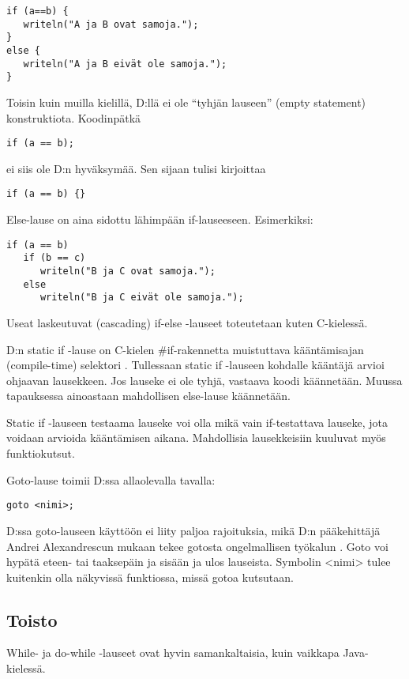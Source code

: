\documentclass[11pt,oneside,a4paper]{article}
\begin{document}
\begin{verbatim}
if (a==b) {
   writeln("A ja B ovat samoja.");
}
else {
   writeln("A ja B eivät ole samoja.");
}
\end{verbatim}
Toisin kuin muilla kielillä, D:llä ei ole ``tyhjän lauseen'' (empty statement)
konstruktiota. Koodinpätkä

\begin{verbatim}
if (a == b);
\end{verbatim}
ei siis ole D:n hyväksymää. Sen sijaan tulisi kirjoittaa

\begin{verbatim}
if (a == b) {}
\end{verbatim}
Else-lause on aina sidottu lähimpään if-lauseeseen. Esimerkiksi:

\begin{verbatim}
if (a == b)
   if (b == c)
      writeln("B ja C ovat samoja.");
   else
      writeln("B ja C eivät ole samoja.");
\end{verbatim}
Useat laskeutuvat (cascading) if-else -lauseet toteutetaan kuten C-kielessä.

D:n static if -lause on C-kielen \#if-rakennetta muistuttava kääntämisajan
(compile-time) selektori \cite{ALE10}.  Tullessaan static if -lauseen kohdalle
kääntäjä arvioi
ohjaavan lausekkeen. Jos lauseke ei ole tyhjä, vastaava koodi käännetään. Muussa
tapauksessa ainoastaan mahdollisen else-lause käännetään. 

Static if -lauseen testaama lauseke voi olla mikä vain if-testattava lauseke,
jota voidaan arvioida kääntämisen aikana. Mahdollisia lausekkeisiin kuuluvat
myös funktiokutsut.

Goto-lause toimii D:ssa allaolevalla tavalla:

\begin{verbatim}
goto <nimi>;
\end{verbatim}
D:ssa goto-lauseen käyttöön ei liity paljoa rajoituksia, mikä D:n pääkehittäjä
Andrei Alexandrescun mukaan tekee gotosta ongelmallisen työkalun \cite{ALE10}.
Goto voi
hypätä eteen- tai taaksepäin ja sisään ja ulos lauseista. Symbolin <nimi> tulee
kuitenkin olla näkyvissä funktiossa, missä gotoa kutsutaan. 

\subsection{Toisto}

While- ja do-while -lauseet ovat hyvin samankaltaisia, kuin vaikkapa
Java-kielessä. 
\end{document}
